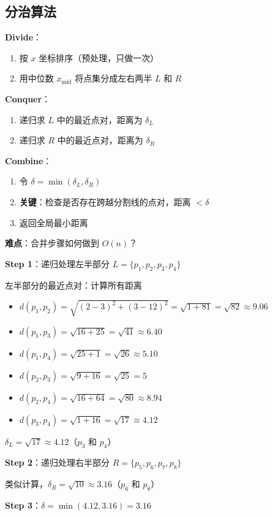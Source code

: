 \documentclass[12pt, a4paper]{ctexart}
\begin{document}
\subsection{分治算法}

\begin{blackboard}[分治策略]

\textbf{Divide}：
\begin{enumerate}
    \item 按 $x$ 坐标排序（预处理，只做一次）
    \item 用中位数 $x_{\text{mid}}$ 将点集分成左右两半 $L$ 和 $R$
\end{enumerate}

\textbf{Conquer}：
\begin{enumerate}
    \item 递归求 $L$ 中的最近点对，距离为 $\delta_L$
    \item 递归求 $R$ 中的最近点对，距离为 $\delta_R$
\end{enumerate}

\textbf{Combine}：
\begin{enumerate}
    \item 令 $\delta = \min(\delta_L, \delta_R)$
    \item \textbf{关键}：检查是否存在跨越分割线的点对，距离 $< \delta$
    \item 返回全局最小距离
\end{enumerate}

\textbf{难点}：合并步骤如何做到 $O(n)$？

\end{blackboard}

\begin{blackboard}[手算例子（续）]

\textbf{Step 1}：递归处理左半部分 $L = \{p_1, p_2, p_3, p_4\}$

左半部分的最近点对：计算所有距离
\begin{itemize}
    \item $d(p_1, p_2) = \sqrt{(2-3)^2 + (3-12)^2} = \sqrt{1 + 81} = \sqrt{82} \approx 9.06$
    \item $d(p_1, p_3) = \sqrt{16 + 25} = \sqrt{41} \approx 6.40$
    \item $d(p_1, p_4) = \sqrt{25 + 1} = \sqrt{26} \approx 5.10$
    \item $d(p_2, p_3) = \sqrt{9 + 16} = \sqrt{25} = 5$
    \item $d(p_2, p_4) = \sqrt{16 + 64} = \sqrt{80} \approx 8.94$
    \item $d(p_3, p_4) = \sqrt{1 + 16} = \sqrt{17} \approx 4.12$
\end{itemize}

$\delta_L = \sqrt{17} \approx 4.12$（$p_3$ 和 $p_4$）

\textbf{Step 2}：递归处理右半部分 $R = \{p_5, p_6, p_7, p_8\}$

类似计算，$\delta_R = \sqrt{10} \approx 3.16$（$p_6$ 和 $p_8$）

\textbf{Step 3}：$\delta = \min(4.12, 3.16) = 3.16$

\end{blackboard}
\end{document}
